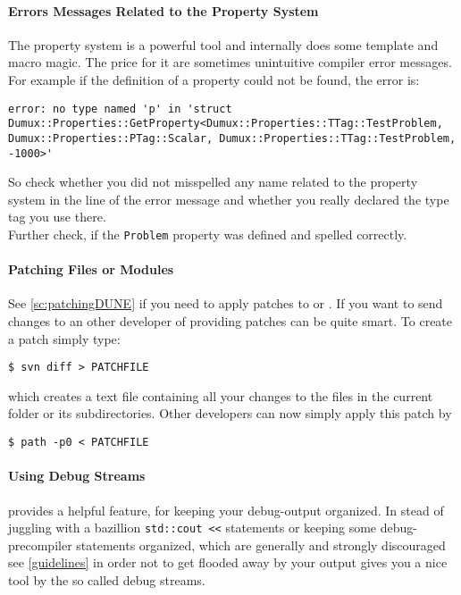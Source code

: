 \paragraph{Errors Messages Related to the Property System}
The property system is a powerful tool and internally does some template and macro magic. 
The price for it are sometimes unintuitive compiler error messages. For example if the
definition of a property could not be found, the error is:
\begin{lstlisting}[style=DumuxCode,numbers=none]
error: no type named 'p' in 'struct Dumux::Properties::GetProperty<Dumux::Properties::TTag::TestProblem, Dumux::Properties::PTag::Scalar, Dumux::Properties::TTag::TestProblem, -1000>'
\end{lstlisting}

\noindent So check whether you did not misspelled any name related to the property system in the 
line of the error message and whether you really declared the type tag you use there.\\
Further check, if the \texttt{Problem} property was defined and spelled correctly.

\paragraph{Patching Files or Modules}
See \ref{sc:patchingDUNE} if you need to apply patches to \Dumux or \Dune.
If you want to send changes to an other developer of \Dumux providing patches
can be quite smart. To create a patch simply type:
\begin{lstlisting}[style=Bash]
$ svn diff > PATCHFILE
\end{lstlisting}
\noindent which creates a text file containing all your changes to the files
in the current folder or its subdirectories.
Other developers can now simply apply this patch by 
\begin{lstlisting}[style=Bash]
$ path -p0 < PATCHFILE
\end{lstlisting}

\paragraph{Using \Dune Debug Streams}
\Dune provides a helpful feature, for keeping your debug-output organized. 
  In stead of juggling with a bazillion \texttt{std::cout <<} statements or keeping some debug-precompiler statements organized, which are generally and strongly discouraged see \ref{guidelines} in order not to get 
  flooded away by your output \Dune gives you a nice tool by the so called debug streams. 

